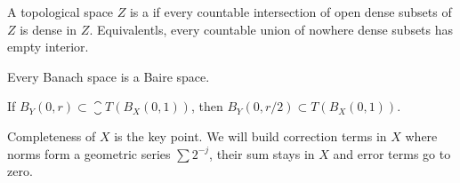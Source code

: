 
\lecture{}

\begin{definition}
A topological space $Z$ is a  if every countable
intersection of open dense subsets of $Z$ is dense in
$Z$. Equivalentls, every countable union of nowhere dense subsets has
empty interior.
\end{definition}

\begin{fact}
Every Banach space is a Baire space.
\end{fact}

\begin{lemma}
If $B_{Y}(0,r)\subset\closure{T(B_{X}(0,1))}$, then
$B_{Y}(0,r/2)\subset T(B_{X}(0,1))$.
\end{lemma}

\begin{remark}
Completeness of $X$ is the key point. We will build correction terms
in $X$ where norms form a geometric series $\sum2^{-j}$, their sum
stays in $X$ and error terms go to zero.
\end{remark}

